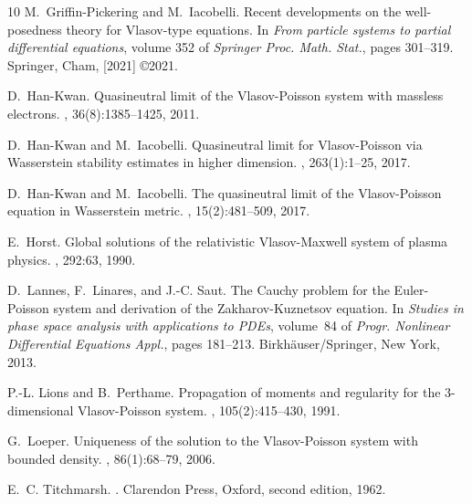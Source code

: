 \documentclass[11pt,reqno,a4paper]{amsart}
\theoremstyle{definition}
\theoremstyle{remark}
\numberwithin{equation}{section}
\begin{document}
\begin{thebibliography}{10}
M.~Griffin-Pickering and M.~Iacobelli.
\newblock Recent developments on the well-posedness theory for {V}lasov-type
  equations.
\newblock In {\em From particle systems to partial differential equations},
  volume 352 of {\em Springer Proc. Math. Stat.}, pages 301--319. Springer,
  Cham, [2021] \copyright 2021.

D.~Han-Kwan.
\newblock Quasineutral limit of the {V}lasov-{P}oisson system with massless
  electrons.
, 36(8):1385--1425, 2011.

D.~Han-Kwan and M.~Iacobelli.
\newblock Quasineutral limit for {V}lasov-{P}oisson via {W}asserstein stability
  estimates in higher dimension.
, 263(1):1--25, 2017.

D.~Han-Kwan and M.~Iacobelli.
\newblock The quasineutral limit of the {V}lasov-{P}oisson equation in
  {W}asserstein metric.
, 15(2):481--509, 2017.

E.~Horst.
\newblock Global solutions of the relativistic {V}lasov-{M}axwell system of
  plasma physics.
, 292:63, 1990.


D.~Lannes, F.~Linares, and J.-C. Saut.
\newblock The {C}auchy problem for the {E}uler-{P}oisson system and derivation
  of the {Z}akharov-{K}uznetsov equation.
\newblock In {\em Studies in phase space analysis with applications to {PDE}s},
  volume~84 of {\em Progr. Nonlinear Differential Equations Appl.}, pages
  181--213. Birkh\"{a}user/Springer, New York, 2013.

P.-L. Lions and B.~Perthame.
\newblock Propagation of moments and regularity for the {$3$}-dimensional
  {V}lasov-{P}oisson system.
, 105(2):415--430, 1991.

G.~Loeper.
\newblock Uniqueness of the solution to the {V}lasov-{P}oisson system with
  bounded density.
, 86(1):68--79, 2006.

E.~C. Titchmarsh.
.
\newblock Clarendon Press, Oxford, second edition, 1962.

\end{thebibliography}
\end{document}
